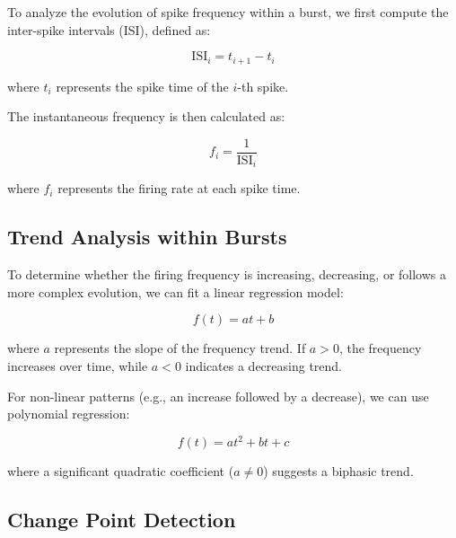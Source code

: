 \documentclass[a4paper,9pt]{extarticle}
\begin{document}
To analyze the evolution of spike frequency within a burst, we first compute the inter-spike intervals (ISI), defined as:

\begin{equation}
    \text{ISI}_i = t_{i+1} - t_i
\end{equation}

where \( t_i \) represents the spike time of the \( i \)-th spike.

The instantaneous frequency is then calculated as:

\begin{equation}
    f_i = \frac{1}{\text{ISI}_i}
\end{equation}

where \( f_i \) represents the firing rate at each spike time.

\subsection{Trend Analysis within Bursts}

To determine whether the firing frequency is increasing, decreasing, or follows a more complex evolution, we can fit a linear regression model:

\begin{equation}
    f(t) = a t + b
\end{equation}

where \( a \) represents the slope of the frequency trend. If \( a > 0 \), the frequency increases over time, while \( a < 0 \) indicates a decreasing trend.

For non-linear patterns (e.g., an increase followed by a decrease), we can use polynomial regression:

\begin{equation}
    f(t) = a t^2 + b t + c
\end{equation}

where a significant quadratic coefficient (\( a \neq 0 \)) suggests a biphasic trend.

\subsection{Change Point Detection}
\end{document}
